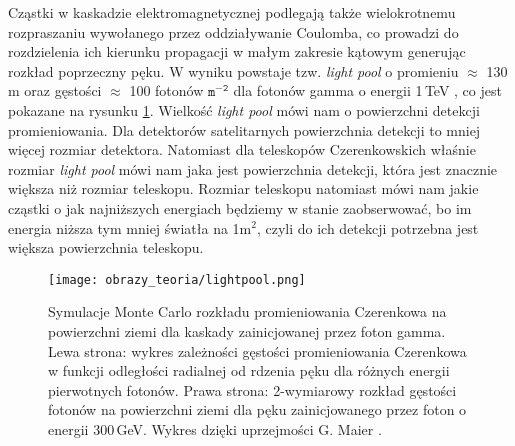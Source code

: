 \documentclass[a4paper,11pt,twoside]{article}
\begin{document}
Cząstki w kaskadzie elektromagnetycznej podlegają także wielokrotnemu rozpraszaniu wywołanego przez oddziaływanie Coulomba, co prowadzi do rozdzielenia ich kierunku propagacji w małym zakresie kątowym generując rozkład poprzeczny pęku. W wyniku powstaje tzw. \textsl{light pool} o promieniu $\approx$ 130\,m oraz gęstości $\approx$ 100 fotonów $\mathtt{m^{-2}}$ dla fotonów gamma o energii 1\,TeV \cite{IACT}, co jest pokazane na rysunku \ref{fig:lightpool}. Wielkość \textsl{light pool} mówi nam o powierzchni detekcji promieniowania. Dla detektorów satelitarnych powierzchnia detekcji to mniej więcej rozmiar detektora. Natomiast dla teleskopów Czerenkowskich właśnie rozmiar \textsl{light pool} mówi nam jaka jest powierzchnia detekcji, która jest znacznie większa niż rozmiar teleskopu. Rozmiar teleskopu natomiast mówi nam jakie cząstki o jak najniższych energiach będziemy w stanie zaobserwować, bo im energia niższa tym mniej światła na 1m$^2$, czyli do ich detekcji potrzebna jest większa powierzchnia teleskopu. 
\begin{figure}[H] 
\centering
\texttt{[image: obrazy\_teoria/lightpool.png]}
\caption{Symulacje Monte Carlo rozkładu promieniowania Czerenkowa na powierzchni ziemi dla kaskady zainicjowanej przez foton gamma. Lewa strona: wykres zależności gęstości promieniowania Czerenkowa w funkcji odległości radialnej od rdzenia pęku dla różnych energii pierwotnych fotonów. Prawa strona: 2-wymiarowy rozkład gęstości fotonów na powierzchni ziemi dla pęku zainicjowanego przez foton o energii 300\,GeV. Wykres dzięki uprzejmości G. Maier \cite{IACT}.}
\label{fig:lightpool}
\end{figure}
\end{document}

